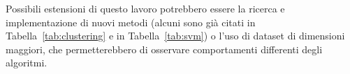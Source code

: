 \documentclass[oneside, openany]{book}
\begin{document}
	Possibili estensioni di questo lavoro potrebbero essere la ricerca e implementazione di nuovi metodi (alcuni sono già citati in Tabella~\ref{tab:clustering} e in Tabella~\ref{tab:svm}) o l'uso di dataset di dimensioni maggiori, che permetterebbero di osservare comportamenti differenti degli algoritmi.
	
	{}
\end{document}
